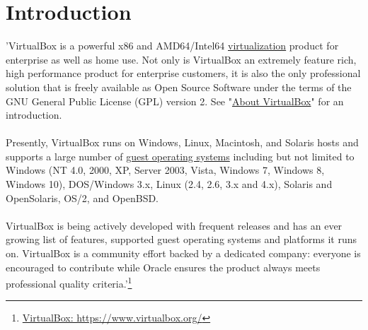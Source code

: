 
\newpage
\setcounter{secnumdepth}{0}
\section{Introduction}

'VirtualBox is a powerful x86 and AMD64/Intel64
\href{https://www.virtualbox.org/wiki/Virtualization}{virtualization}
product for enterprise as well as home use.  Not only is VirtualBox
an extremely feature rich, high performance product for enterprise 
customers, it is also the only professional solution that is freely
available as Open Source Software under the terms of the GNU General
Public License (GPL) version 2. See 
"\href{https://www.virtualbox.org/wiki/VirtualBox}{About VirtualBox}"
for an introduction.\\
\\
Presently, VirtualBox runs on Windows, Linux, Macintosh, and Solaris
hosts and supports a large number of
\href{https://www.virtualbox.org/wiki/Guest_OSes}{guest operating systems}
including but not limited to Windows (NT 4.0, 2000, XP, Server 2003, Vista,
Windows 7, Windows 8, Windows 10), DOS/Windows 3.x, Linux (2.4, 2.6,
3.x and 4.x), Solaris and OpenSolaris, OS/2, and OpenBSD.\\
\\
VirtualBox is being actively developed with frequent releases and has
an ever growing list of features, supported guest operating systems
and platforms it runs on.  VirtualBox is a community effort backed by
a dedicated company: everyone is encouraged to contribute while Oracle
ensures the product always meets professional quality criteria.'\footnote{\href{https://www.virtualbox.org/}{VirtualBox: https://www.virtualbox.org/}}

